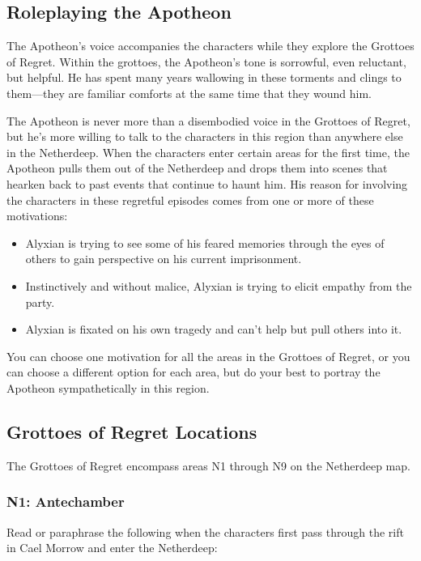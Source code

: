 \documentclass[a4paper, 11pt, bg=full, twocolumn, nooutline]{dndbook}
\begin{document}
\subsection{Roleplaying the Apotheon}

The Apotheon's voice accompanies the characters while they explore the Grottoes of Regret. Within the grottoes, the Apotheon's tone is sorrowful, even reluctant, but helpful. He has spent many years wallowing in these torments and clings to them---they are familiar comforts at the same time that they wound him.

The Apotheon is never more than a disembodied voice in the Grottoes of Regret, but he's more willing to talk to the characters in this region than anywhere else in the Netherdeep. When the characters enter certain areas for the first time, the Apotheon pulls them out of the Netherdeep and drops them into scenes that hearken back to past events that continue to haunt him. His reason for involving the characters in these regretful episodes comes from one or more of these motivations:

\begin{itemize}
\item Alyxian is trying to see some of his feared memories through the eyes of others to gain perspective on his current imprisonment.
\item Instinctively and without malice, Alyxian is trying to elicit empathy from the party.
\item Alyxian is fixated on his own tragedy and can't help but pull others into it.
\end{itemize}

You can choose one motivation for all the areas in the Grottoes of Regret, or you can choose a different option for each area, but do your best to portray the Apotheon sympathetically in this region.

\subsection{Grottoes of Regret Locations}

The Grottoes of Regret encompass areas N1 through N9 on the Netherdeep map.

\subsubsection{N1: Antechamber}

Read or paraphrase the following when the characters first pass through the rift in Cael Morrow and enter the Netherdeep:
\end{document}
